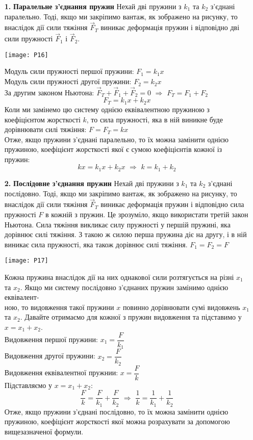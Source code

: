 \documentclass[a4paper,12pt]{article}
\begin{document}
\begin{itemize}
\item[\textbf{\textcolor{EdErablue}{1.}}] \textcolor{EdErablue}{\textbf{Паралельне з'єднання пружин}} 
Нехай дві пружини з $k_1$ та $k_2$ з'єднані паралельно. Тоді, якщо ми закріпимо вантаж, як зображено на рисунку, то внаслідок дії сили тяжіння $\vec{F}_{T}$ виникає деформація пружин і відповідно дві сили пружності $\vec{F}_1$ і $\vec{F}_2$.
\begin{center}
\texttt{[image: P16]}
\end{center}
Модуль сили пружності першої пружини: $F_1 = k_1x$\\
Модуль сили пружності другої пружини: $F_2 = k_2x$\\
За другим законом Ньютона: $\vec{F}_{T} + \vec{F}_1 + \vec{F}_2 = 0\,\,\Rightarrow \,\, F_T = F_1 + F_2$ \textcolor{EdErablue}{$$F_T = k_1x + k_2x$$}
Коли ми замінемо цю систему однією еквівалентною пружиною з коефіцієнтом жорсткості $k$, то сила пружності, яка в ній виникне буде дорівнювати силі тяжіння: \textcolor{EdErablue}{$ F = F_T = kx$}\\ 
Отже, якщо пружини з'єднані паралельно, то їх можна замінити однією пружиною, коефіцієнт жорсткості якої є сумою коефіцієнтів кожної із пружин: $$kx = k_1x + k_2x\,\,\Rightarrow\,\,\boxed{k=k_1+k_2}$$
\newpage
\item[\textbf{\textcolor{EdErablue}{2.}}] \textcolor{EdErablue}{\textbf{Послідовне з'єднання пружин}} 
Нехай дві пружини з $k_1$ та $k_2$ з'єднані послідовно. Тоді, якщо ми закріпимо вантаж, як зображено на рисунку, то внаслідок дії сили тяжіння $\vec{F}_{T}$ виникає деформація пружин і відповідно  сила пружності ${F}$ в кожній з пружин. Це зрозуміло, якщо використати третій закон Ньютона. Сила тяжіння викликає силу пружності у першій пружині, яка дорівнює силі тяжіння. З такою ж силою перша пружина діє на другу, і в ній виникає сила пружності, яка також дорівнює силі тяжіння. $F_1 = F_2 = F$ 
\begin{center}
\texttt{[image: P17]}
\end{center}
Кожна пружина внаслідок дії на них однакової сили розтягується на різні $x_1$ та $x_2$. Якщо ми систему послідовно з'єднаних пружин замінимо однією еквівалент-\\ною, то видовження такої пружини $x$ повинно дорівнювати сумі видовжень $x_1$ та $x_2$. Давайте отримаємо для кожної з пружин видовження та підставимо у $x = x_1 + x_2$.\\

Видовження першої пружини: $x_1 = \dfrac{F}{k_1}$\\
Видовження другої пружини: $x_2 = \dfrac{F}{k_2}$\\
Видовження еквівалентної пружнии: $x = \dfrac{F}{k}$\\

Підставляємо у $x = x_1 + x_2$: $$\dfrac{F}{k} = \dfrac{F}{k_1}+ \dfrac{F}{k_2}\,\,\Rightarrow \,\, \boxed{\dfrac{1}{k} = \dfrac{1}{k_1} + \dfrac{1}{k_2}}$$
Отже, якщо пружини з'єднані послідовно, то їх можна замінити однією пружиною, коефіцієнт жорсткості якої можна розрахувати за допомогою вищезазначеної формули. 
\end{itemize}
\end{document}
